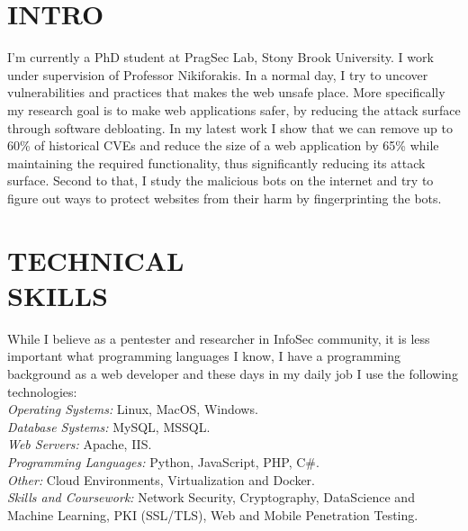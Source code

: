 \documentclass[margin, 10pt]{res} %
\begin{document}
\begin{resume}

 
\section{INTRO}  

I'm currently a PhD student at PragSec Lab, Stony Brook University. I work under supervision of Professor Nikiforakis. In a normal day, I try to uncover vulnerabilities and practices that makes the web unsafe place. More specifically my research goal is to make web applications safer, by reducing the attack surface through software debloating.
In my latest work I show that we can remove up to 60\% of historical CVEs and reduce the size of a web application by 65\% while maintaining the required functionality, thus significantly reducing its attack surface. Second to that, I study the malicious bots on the internet and try to figure out ways to protect websites from their harm by fingerprinting the bots.


\section{TECHNICAL \\ SKILLS} 


While I believe as a pentester and researcher in InfoSec community, it is less important what programming languages I know, I have a programming background as a web developer and these days in my daily job I use the following technologies:\\
{\sl Operating Systems:} Linux, MacOS, Windows. \\
{\sl Database Systems:} MySQL, MSSQL. \\
{\sl Web Servers:} Apache, IIS. \\
{\sl Programming Languages:} Python, JavaScript, PHP, C\#. \\
{\sl Other:} Cloud Environments, Virtualization and Docker. \\
{\sl Skills and Coursework:} Network Security, Cryptography, DataScience and Machine Learning, PKI (SSL/TLS), Web and Mobile Penetration Testing. \\
 

\end{resume}
\end{document}
